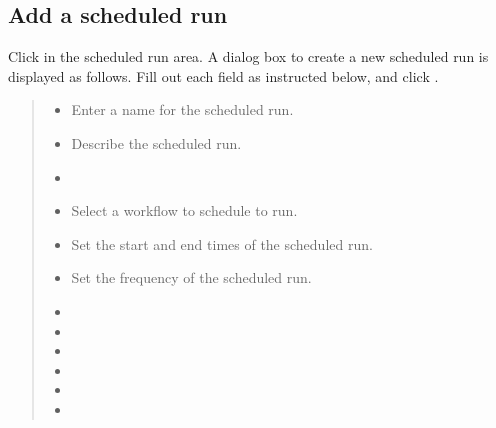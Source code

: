 \documentclass[letterpaper,10pt,english]{sphinxmanual}
\begin{document}
\subsection{Add a scheduled run}
\label{\detokenize{integrator/part03/scheduled_run:id3}}
Click  in the scheduled run area. A dialog box to create a new scheduled run is displayed as follows. Fill out each field as instructed below, and click .
\begin{quote}

\begin{figure}[H]
\centering

\noindent{}
\end{figure}
\begin{itemize}
\item {} 
 Enter a name for the scheduled run.

\item {} 
 Describe the scheduled run.

\item {} 

\item {} 
 Select a workflow to schedule to run.

\item {} 
 Set the start and end times of the scheduled run.

\item {} 
 Set the frequency of the scheduled run.

\item {} 

\item {} 

\item {} 

\item {} 

\item {} 

\item {} 

\end{itemize}
\end{quote}
\end{document}
